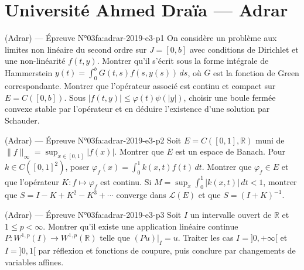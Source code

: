 \section{Université Ahmed Draïa --- Adrar}
\begin{problem}{(Adrar) — Épreuve N°03}{fa:adrar-2019-e3-p1}
On considère un problème aux limites non linéaire du second ordre sur $J=[0,b]$ avec conditions de Dirichlet et une non-linéarité $f(t,y)$. Montrer qu'il s'écrit sous la forme intégrale de Hammerstein $y(t)=\int_0^bG(t,s)f(s,y(s))\,ds$, où $G$ est la fonction de Green correspondante. Montrer que l'opérateur associé est continu et compact sur $E=C([0,b])$. Sous $|f(t,y)|\le\varphi(t)\psi(|y|)$, choisir une boule fermée convexe stable par l'opérateur et en déduire l'existence d'une solution par Schauder.
\end{problem}
\newpage
\begin{problem}{(Adrar) — Épreuve N°03}{fa:adrar-2019-e3-p2}
Soit $E=C([0,1],\mathbb R)$ muni de $\|f\|_\infty=\sup_{x\in[0,1]}|f(x)|$. Montrer que $E$ est un espace de Banach. Pour $k\in C([0,1]^2)$, poser $\varphi_f(x)=\int_0^1k(x,t)f(t)\,dt$. Montrer que $\varphi_f\in E$ et que l'opérateur $K:f\mapsto\varphi_f$ est continu. Si $M=\sup_x\int_0^1|k(x,t)|\,dt<1$, montrer que $S=I-K+K^2-K^3+\cdots$ converge dans $\mathcal L(E)$ et que $S=(I+K)^{-1}$.
\end{problem}
\newpage
\begin{problem}{(Adrar) — Épreuve N°03}{fa:adrar-2019-e3-p3}
Soit $I$ un intervalle ouvert de $\mathbb R$ et $1\le p<\infty$. Montrer qu'il existe une application linéaire continue $P:W^{1,p}(I)\to W^{1,p}(\mathbb R)$ telle que $(Pu)|_I=u$. Traiter les cas $I=]0,+\infty[$ et $I=]0,1[$ par réflexion et fonctions de coupure, puis conclure par changements de variables affines.
\end{problem}
\newpage

